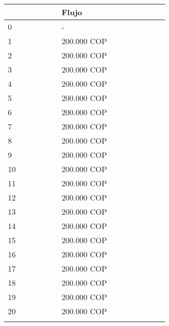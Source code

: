 \begin{center}
\begin{longtable}[H]{|p{0.333\linewidth}|p{0.3333\linewidth}|p{0.3333\linewidth}|}
{\begin{center}
\begin{tabular}{ |p{3.5cm}| p{3cm}|}
    \textbf{Periodo (psv) } & \textbf{Flujo} \\ \hline
    0                       & -              \\\hline
    1                       &  200.000 COP     \\ \hline
    2                       &  200.000 COP     \\ \hline
    3                       &  200.000 COP     \\ \hline
    4                       &  200.000 COP     \\ \hline
    5                       &  200.000 COP     \\ \hline
    6                       &  200.000 COP     \\ \hline
    7                       &  200.000 COP     \\ \hline
    8                       &  200.000 COP     \\ \hline
    9                       &  200.000 COP     \\ \hline
    10                      &  200.000 COP     \\ \hline
    11                      &  200.000 COP     \\ \hline
    12                      &  200.000 COP     \\ \hline
    13                      &  200.000 COP     \\ \hline
    14                      &  200.000 COP     \\ \hline
    15                      &  200.000 COP     \\ \hline
    16                      &  200.000 COP     \\ \hline
    17                      &  200.000 COP     \\ \hline
    18                      &  200.000 COP     \\ \hline
    19                      &  200.000 COP     \\ \hline
    20                      &  200.000 COP     \\ \hline
   \end{tabular}


\end{center}}
\end{longtable}
\end{center}
